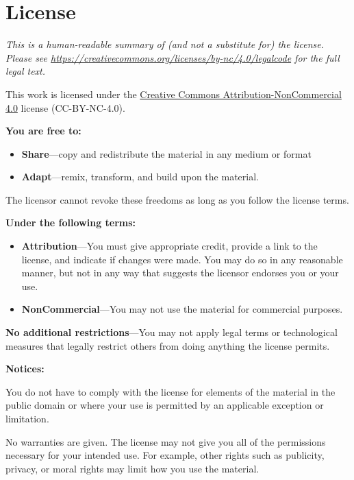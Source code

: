 \chapter{License}\label{s:license}

\emph{This is a human-readable summary of (and not a substitute for) the license.
Please see \url{https://creativecommons.org/licenses/by-nc/4.0/legalcode} for the full legal text.}

This work is licensed under the
\href{https://creativecommons.org/licenses/by-nc/4.0/}{Creative Commons Attribution-NonCommercial 4.0} license
(CC-BY-NC-4.0).

\textbf{You are free to:}

\begin{itemize}
\item
  \textbf{Share}---copy and redistribute the material in any medium or
  format
\item
  \textbf{Adapt}---remix, transform, and build upon the material.
\end{itemize}

The licensor cannot revoke these freedoms as long as you follow the
license terms.

\textbf{Under the following terms:}

\begin{itemize}
\item
  \textbf{Attribution}---You must give appropriate credit, provide a link
  to the license, and indicate if changes were made. You may do so in
  any reasonable manner, but not in any way that suggests the licensor
  endorses you or your use.
\item
  \textbf{NonCommercial}---You may not use the material for commercial purposes.
\end{itemize}

\textbf{No additional restrictions}---You may not apply legal terms or
technological measures that legally restrict others from doing anything the
license permits.

\textbf{Notices:}

You do not have to comply with the license for elements of the
material in the public domain or where your use is permitted by an
applicable exception or limitation.

No warranties are given. The license may not give you all of the
permissions necessary for your intended use. For example, other rights
such as publicity, privacy, or moral rights may limit how you use the
material.
